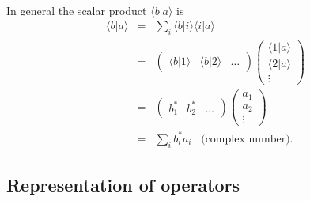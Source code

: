 \paragraph{}
In general the scalar product $\langle b|a\rangle$ is
\begin{eqnarray}
\langle b|a\rangle &=& \sum_i \langle b|i\rangle \langle i|a \rangle \nonumber \\
&=& \begin{pmatrix} \langle b|1\rangle & \langle b|2\rangle & \ldots \end{pmatrix}
     \begin{pmatrix} \langle 1|a\rangle \\ \langle 2|a\rangle \\ \vdots \end{pmatrix} \nonumber \\
&=& 	\begin{pmatrix} b_1^* & b_2^* & \ldots \end{pmatrix}
     \begin{pmatrix} a_1 \\ a_2 \\ \vdots \end{pmatrix} \nonumber \\	
&=& \sum_i b_i^*a_i \;\;\; \text{(complex number)}.
\end{eqnarray}		




\subsection{Representation of operators}

